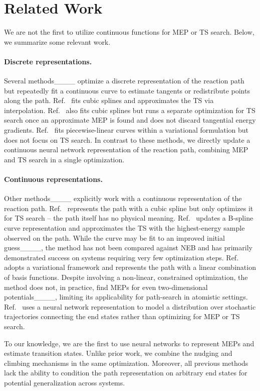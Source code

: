 \section{Related Work}
\label{sec:related}
We are not the first to utilize continuous functions for MEP or TS search. Below, we summarize some relevant work.

\paragraph{Discrete representations.}
Several methods____ optimize a discrete representation of the reaction path but repeatedly fit a continuous curve to estimate tangents or redistribute points along the path. Ref.~ fits cubic splines and approximates the TS via interpolation. Ref.~ also fits cubic splines but runs a separate optimization for TS search once an approximate MEP is found and does not discard tangential energy gradients. Ref.~ fits piecewise-linear curves within a variational formulation but does not focus on TS search. In contrast to these methods, we directly update a continuous neural network representation of the reaction path, combining MEP and TS search in a single optimization.

\paragraph{Continuous representations.}
Other methods____ explicitly work with a continuous representation of the reaction path. Ref.~ represents the path with a cubic spline but only optimizes it for TS search -- the path itself has no physical meaning. Ref.~ updates a B-spline curve representation and approximates the TS with the highest-energy sample observed on the path. While the curve may be fit to an improved initial guess____, the method has not been compared against NEB and has primarily demonstrated success on systems requiring very few optimization steps. Ref.~ adopts a variational framework and represents the path with a linear combination of basis functions. Despite involving a non-linear, constrained optimization, the method does not, in practice, find MEPs for even two-dimensional potentials____, limiting its applicability for path-search in atomistic settings. 
Ref.~ uses a neural network representation to model a distribution over stochastic trajectories connecting the end states rather than optimizing for MEP or TS search. 

To our knowledge, we are the first to use neural networks to represent MEPs and estimate transition states. Unlike prior work, we combine the nudging and climbing mechanisms in the same optimization. Moreover, all previous methods lack the ability to condition the path representation on arbitrary end states for potential generalization across systems.